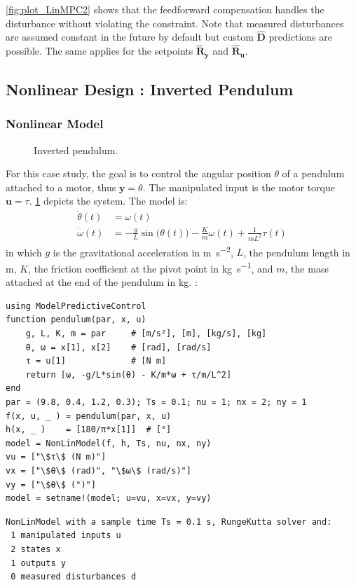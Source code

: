 \cref{fig:plot_LinMPC2} shows that the feedforward compensation handles the disturbance without violating the constraint. Note that measured disturbances are assumed constant in the future by default but custom $\mathbf{\hat{D}}$ predictions are possible. The same applies for the setpoints $\mathbf{\hat{R}_y}$ and $\mathbf{\hat{R}_u}$.

\subsection{Nonlinear Design : Inverted Pendulum}
\label{sec.nonlinear_design}

\subsubsection{Nonlinear Model}

\begin{figure}[b]
    \centering
    
    \caption{Inverted pendulum.}
    \label{fig:pendulum}
\end{figure}

For this case study, the goal is to control the angular position $\theta$ of a pendulum attached to a motor, thus $\mathbf{y} = \theta$. The manipulated input is the motor torque $\mathbf{u} = \tau$. \cref{fig:pendulum} depicts the system. The model is:
\begin{subequations}
\begin{align}
\dot{\theta}(t) &= \omega(t) \\
\dot{\omega}(t) &= -\frac{g}{L}\sin\big(\theta(t)\big) -\frac{K}{m}\omega(t) + \frac{1}{m L^2}\tau(t) \label{eq.pendulum_speed}
\end{align}
\end{subequations}
in which $g$ is the gravitational acceleration in \si{\meter\per\second\squared}, $L$, the pendulum length in \si{\meter}, $K$, the friction coefficient at the pivot point in \si{\kilogram\per\second}, and $m$, the mass attached at the end of the pendulum in \si{\kilogram}. :
\vspace*{-5pt}
\begin{verbatim}
using ModelPredictiveControl
function pendulum(par, x, u)
    g, L, K, m = par     # [m/s²], [m], [kg/s], [kg]
    θ, ω = x[1], x[2]    # [rad], [rad/s]
    τ = u[1]             # [N m]
    return [ω, -g/L*sin(θ) - K/m*ω + τ/m/L^2]
end
par = (9.8, 0.4, 1.2, 0.3); Ts = 0.1; nu = 1; nx = 2; ny = 1
f(x, u, _ ) = pendulum(par, x, u)
h(x, _ )    = [180/π*x[1]]  # [°]
model = NonLinModel(f, h, Ts, nu, nx, ny)
vu = ["\$τ\$ (N m)"]
vx = ["\$θ\$ (rad)", "\$ω\$ (rad/s)"]
vy = ["\$θ\$ (°)"]
model = setname!(model; u=vu, x=vx, y=vy)
\end{verbatim}
\spacerepl
\begin{verbatim}
NonLinModel with a sample time Ts = 0.1 s, RungeKutta solver and:
 1 manipulated inputs u
 2 states x
 1 outputs y
 0 measured disturbances d
\end{verbatim}

